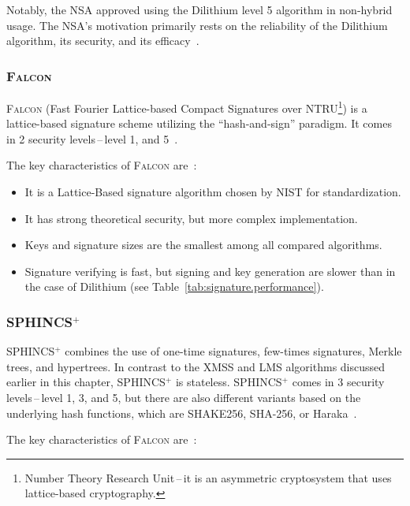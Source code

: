 Notably, the NSA approved using the Dilithium level 5 algorithm in non-hybrid usage. The NSA’s motivation primarily rests on the reliability of the Dilithium algorithm, its security, and its efficacy~\cite{NUKIB.min.attachment}.

\subsubsection{\textsc{Falcon}}

\textsc{Falcon} (Fast Fourier Lattice-based Compact Signatures over NTRU\footnote{Number Theory Research Unit\,--\,it is an asymmetric cryptosystem that uses lattice-based cryptography.}) is a lattice-based signature scheme utilizing the “hash-and-sign” paradigm. It comes in 2 security levels\,--\,level 1, and 5~\cite{NIST.round3.report}.

\noindent The key characteristics of \textsc{Falcon} are~\cite{NIST.round3.report}:

\begin{itemize}
    \item It is a Lattice-Based signature algorithm chosen by NIST for standardization.
    \item It has strong theoretical security, but more complex implementation.
    \item Keys and signature sizes are the smallest among all compared algorithms.
    \item Signature verifying is fast, but signing and key generation are slower than in the case of Dilithium (see Table~\ref{tab:signature.performance}).
\end{itemize}

\subsubsection{SPHINCS$^+$}

SPHINCS$^+$ combines the use of one-time signatures, few-times signatures, Merkle trees, and hypertrees. In contrast to the XMSS and LMS algorithms discussed earlier in this chapter, SPHINCS$^+$ is stateless. SPHINCS$^+$ comes in 3 security levels\,--\,level 1, 3, and 5, but there are also different variants based on the underlying hash functions, which are SHAKE256, SHA-256, or Haraka~\cite{signature.SPHINCS,NIST.round3.report}.

\noindent The key characteristics of \textsc{Falcon} are~\cite{NIST.round3.report}:

